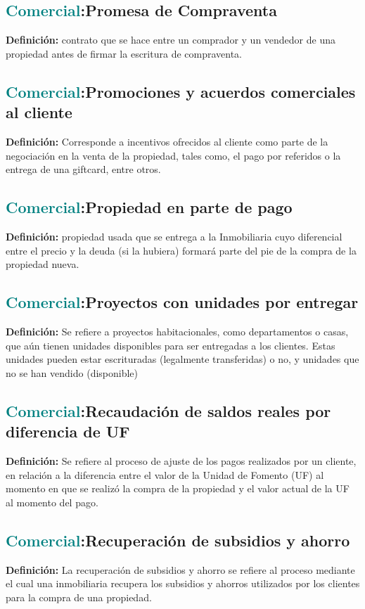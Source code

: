 \documentclass[12pt]{article}
\begin{document}
\subsection{\textcolor{teal}{Comercial}:{Promesa de Compraventa}}
\textbf{Definición:} contrato que se hace entre un comprador y un vendedor de una propiedad antes de firmar la escritura de compraventa.
\subsection{\textcolor{teal}{Comercial}:{Promociones y acuerdos comerciales al cliente }}
\textbf{Definición:} Corresponde a incentivos ofrecidos al cliente como parte de la negociación en la venta de la propiedad, tales como, el pago por referidos o la entrega de una giftcard, entre otros.
\subsection{\textcolor{teal}{Comercial}:{Propiedad en parte de pago}}
\textbf{Definición:} propiedad usada que se entrega a la Inmobiliaria cuyo diferencial entre el precio y la deuda (si la hubiera) formará parte del pie de la compra de la propiedad nueva.
\subsection{\textcolor{teal}{Comercial}:{Proyectos con unidades por entregar}}
\textbf{Definición:} Se refiere a proyectos habitacionales, como departamentos o casas, que aún tienen unidades disponibles para ser entregadas a los clientes. Estas unidades pueden estar escrituradas (legalmente transferidas) o no, y unidades que no se han vendido (disponible)
\subsection{\textcolor{teal}{Comercial}:{Recaudación de saldos reales por diferencia de UF}}
\textbf{Definición:} Se refiere al proceso de ajuste de los pagos realizados por un cliente, en relación a la diferencia entre el valor de la Unidad de Fomento (UF) al momento en que se realizó la compra de la propiedad y el valor actual de la UF al momento del pago.
\subsection{\textcolor{teal}{Comercial}:{Recuperación de subsidios y ahorro}}
\textbf{Definición:} La recuperación de subsidios y ahorro se refiere al proceso mediante el cual una inmobiliaria recupera los subsidios y ahorros utilizados por los clientes para la compra de una propiedad. 
\end{document}
